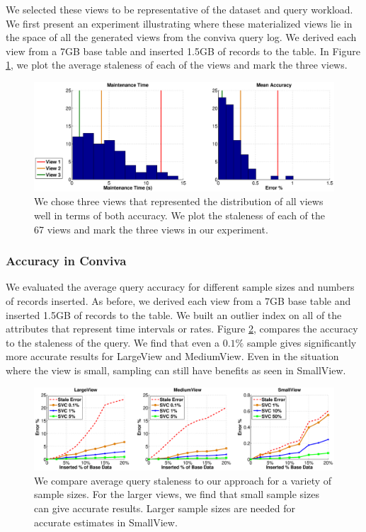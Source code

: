 We selected these views to be representative of the dataset and query workload. 
We first present an experiment illustrating where these materialized views lie in the space of all the generated views from the conviva query log.
We derived each view from a 7GB base table and inserted 1.5GB of records to the table. 
In Figure \ref{exp12conviva}, we plot the average staleness of each of the views and mark the three views.
\begin{figure}[ht!]
\centering
\includegraphics[scale=0.25]{exp/conviva_efficiency_accuracy.eps}
 \caption{We chose three views that represented the distribution of all views well in terms of both accuracy. We plot the staleness of each of the 67 views and mark the three views in our experiment.\label{exp12conviva}}
\end{figure}

\subsubsection{Accuracy in Conviva}
We evaluated the average query accuracy for different sample sizes and numbers of records inserted.
As before, we derived each view from a 7GB base table and inserted 1.5GB of records to the table. 
We built an outlier index on all of the attributes that represent time intervals or rates.
Figure \ref{exp5conviva}, compares the accuracy to the staleness of the query.
We find that even a $0.1\%$ sample gives significantly more accurate results for LargeView and MediumView.
Even in the situation where the view is small, sampling can still have benefits as seen in SmallView.

\begin{figure}[ht!]
\hspace{-3.5em}
\includegraphics[scale=0.22]{exp/exp5-coniva-accuracy.eps}
 \caption{We compare average query staleness to our approach for a variety of sample sizes. For the larger views, we find that small sample sizes can give accurate results. Larger sample sizes are needed for accurate estimates in SmallView. \label{exp5conviva}}
\end{figure}


